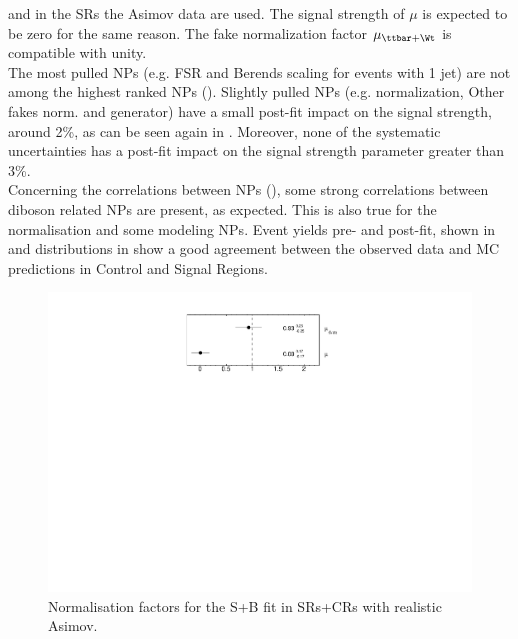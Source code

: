 and in the SRs the Asimov data are used. 
The signal strength of $\mu$ is expected to be zero for the same reason.
The fake normalization factor $\mu_{\ttbar+\Wt}$ is compatible with unity.\\
The most pulled NPs (e.g. \ttbar FSR and \VVHF Berends scaling for events with 1 jet) are
not among the highest ranked NPs (). 
Slightly pulled NPs (e.g. \ttZ normalization, Other fakes norm. and \VVHF generator) have a small post-fit impact on the signal strength, around 2\%, as can be seen again in . Moreover, none of the systematic uncertainties has a post-fit impact on the signal strength parameter greater than 3\%.\\
Concerning the correlations between NPs
(), some strong correlations
between diboson related NPs are present, as expected. This is also
true for the \ttbar normalisation and some \ttbar modeling NPs. 
Event yields pre- and post-fit, shown in  and distributions in  show a good agreement between the observed data and MC predictions in Control and Signal Regions.

\begin{figure}[htbp]
	\centering
	\includegraphics[width=.5\textwidth]{Chapters/CH8/figures/SPLUSB_CRSR_UsingDL1rcFullSys/NormFactors}
	\caption{Normalisation factors for the S+B \tZc fit in SRs+CRs with realistic Asimov.}%
	\label{fig:stat:tzc:splusb:crsr:norm}
\end{figure}

